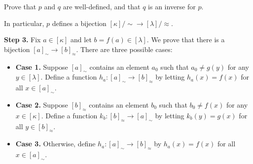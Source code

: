 \begin{cproof}
\begin{exercise}
Prove that $p$ and $q$ are well-defined, and that $q$ is an inverse for $p$.
\end{exercise}




In particular, $p$ defines a bijection $[\kappa]/{\sim} \to [\lambda]/{\approx}$.

\textbf{Step 3.} Fix $a \in [\kappa]$ and let $b=f(a) \in [\lambda]$. We prove that there is a bijection $[a]_{\sim} \to [b]_{\approx}$. There are three possible cases:

\begin{itemize}
\item \textbf{Case 1.} Suppose $[a]_{\sim}$ contains an element $a_0$ such that $a_0 \ne g(y)$ for any $y \in [\lambda]$. Define a function $h_a : [a]_{\sim} \to [b]_{\approx}$ by letting $h_a(x) = f(x)$ for all $x \in [a]_{\sim}$.
\item \textbf{Case 2.} Suppose $[b]_{\approx}$ contains an element $b_0$ such that $b_0 \ne f(x)$ for any $x \in [\kappa]$. Define a function $k_b : [b]_{\approx} \to [a]_{\sim}$ by letting $k_b(y) = g(x)$ for all $y \in [b]_{\approx}$.
\item \textbf{Case 3.} Otherwise, define $h_a : [a]_{\sim} \to [b]_{\approx}$ by $h_a(x) = f(x)$ for all $x \in [a]_{\sim}$.
\end{itemize}


\end{cproof}
